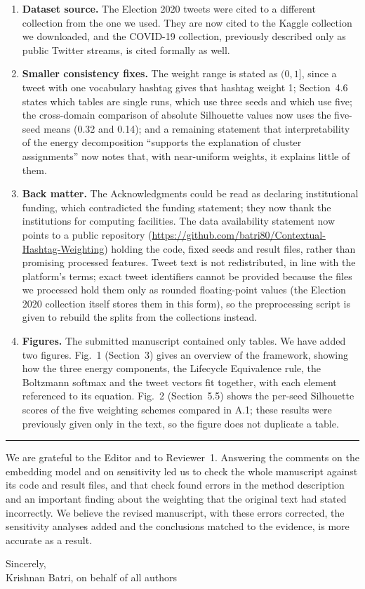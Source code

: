 \documentclass[11pt,a4paper]{article}
\begin{document}
\begin{enumerate}
\item \textbf{Dataset source.} The Election 2020 tweets were cited to a different collection from the one we used. They are now cited to the Kaggle collection we downloaded, and the COVID-19 collection, previously described only as public Twitter streams, is cited formally as well.
\item \textbf{Smaller consistency fixes.} The weight range is stated as $(0, 1]$, since a tweet with one vocabulary hashtag gives that hashtag weight 1; Section~4.6 states which tables are single runs, which use three seeds and which use five; the cross-domain comparison of absolute Silhouette values now uses the five-seed means (0.32 and 0.14); and a remaining statement that interpretability of the energy decomposition ``supports the explanation of cluster assignments'' now notes that, with near-uniform weights, it explains little of them.
\item \textbf{Back matter.} The Acknowledgments could be read as declaring institutional funding, which contradicted the funding statement; they now thank the institutions for computing facilities. The data availability statement now points to a public repository (\url{https://github.com/batri80/Contextual-Hashtag-Weighting}) holding the code, fixed seeds and result files, rather than promising processed features. Tweet text is not redistributed, in line with the platform's terms; exact tweet identifiers cannot be provided because the files we processed hold them only as rounded floating-point values (the Election 2020 collection itself stores them in this form), so the preprocessing script is given to rebuild the splits from the collections instead.
\item \textbf{Figures.} The submitted manuscript contained only tables. We have added two figures. Fig.~1 (Section~3) gives an overview of the framework, showing how the three energy components, the Lifecycle Equivalence rule, the Boltzmann softmax and the tweet vectors fit together, with each element referenced to its equation. Fig.~2 (Section~5.5) shows the per-seed Silhouette scores of the five weighting schemes compared in A.1; these results were previously given only in the text, so the figure does not duplicate a table.
\end{enumerate}

\par\noindent\rule{\linewidth}{0.4pt}\par

We are grateful to the Editor and to Reviewer~1. Answering the comments on the embedding model and on sensitivity led us to check the whole manuscript against its code and result files, and that check found errors in the method description and an important finding about the weighting that the original text had stated incorrectly. We believe the revised manuscript, with these errors corrected, the sensitivity analyses added and the conclusions matched to the evidence, is more accurate as a result.

\medskip
Sincerely,\\
Krishnan Batri, on behalf of all authors
\end{document}
